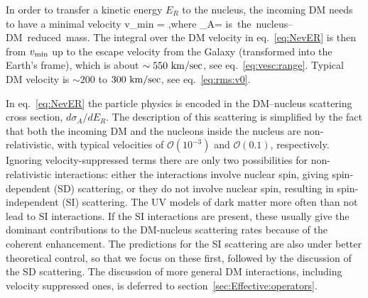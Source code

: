 In order to transfer a kinetic energy $E_R$ to the nucleus, the incoming DM needs to have a minimal velocity
 \beq \label{eq:vmin}
 v_{\rm min} =
 ,\qquad \hbox{where}\qquad
 \mu_A= \quad
 \hbox{is the nucleus--DM reduced mass.}
 \eeq
 The integral over the DM velocity in eq.~\eqref{eq:NevER} is then from $v_{\rm min}$ up to the escape velocity from the Galaxy (transformed into the Earth's frame), which is about $\sim 550 {\rm ~km}/{\rm sec}$, see eq.~\eqref{eq:vesc:range}. 
 Typical DM velocity is $\sim 200$ to $300  {\rm ~km}/{\rm sec}$, see eq.~\eqref{eq:rms:v0}.
 
 
 
In eq.~\eqref{eq:NevER} the particle physics is  encoded  in the DM--nucleus scattering cross section, $d\sigma_A/dE_R$. The description of this scattering is simplified by the fact that both the incoming DM and the nucleons inside the nucleus are non-relativistic, with typical velocities of ${\mathcal O}(10^{-3})$ and ${\mathcal O}(0.1)$, respectively. 
Ignoring velocity-suppressed terms there are only two possibilities for non-relativistic interactions: either the interactions involve nuclear spin, giving spin-dependent (SD) scattering, or they do not involve nuclear spin, resulting in spin-independent (SI) scattering.  
The UV models of dark matter more often than not lead to SI interactions.  If the SI interactions are present, these usually give the dominant contributions to the DM-nucleus scattering rates because of the coherent enhancement. The predictions for the SI scattering are also under better theoretical control, so that we focus on these first, 
followed by the discussion of  the SD scattering. The discussion of more general DM interactions, including velocity suppressed ones, is deferred  to section~\ref{sec:Effective:operators}. 


